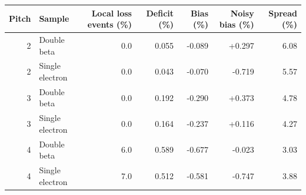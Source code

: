 \begin{tabular}{rlrrrrr}
\toprule
Pitch & Sample & Local loss events (\%) & Deficit (\%) & Bias (\%) & Noisy bias (\%) & Spread (\%) \\
\midrule
2 & Double beta & 0.0 & 0.055 & -0.089 & +0.297 & 6.08 \\
2 & Single electron & 0.0 & 0.043 & -0.070 & -0.719 & 5.57 \\
3 & Double beta & 0.0 & 0.192 & -0.290 & +0.373 & 4.78 \\
3 & Single electron & 0.0 & 0.164 & -0.237 & +0.116 & 4.27 \\
4 & Double beta & 6.0 & 0.589 & -0.677 & -0.023 & 3.03 \\
4 & Single electron & 7.0 & 0.512 & -0.581 & -0.747 & 3.88 \\
\bottomrule
\end{tabular}

